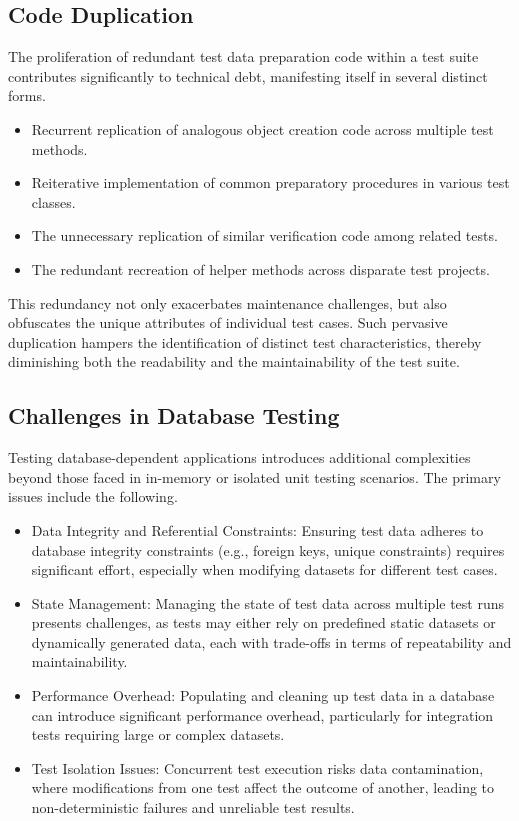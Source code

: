 \subsection{Code Duplication}
The proliferation of redundant test data preparation code within a test suite contributes significantly to technical debt, manifesting itself in several distinct forms.
	      \begin{itemize}
		      \item Recurrent replication of analogous object creation code across multiple test methods.
		      \item Reiterative implementation of common preparatory procedures in various test classes.
            \item The unnecessary replication of similar verification code among related tests.
            \item The redundant recreation of helper methods across disparate test projects.
	      \end{itemize}
This redundancy not only exacerbates maintenance challenges, but also obfuscates the unique attributes of individual test cases. Such pervasive duplication hampers the identification of distinct test characteristics, thereby diminishing both the readability and the maintainability of the test suite.

\subsection{Challenges in Database Testing}

Testing database-dependent applications introduces additional complexities beyond those faced in in-memory or isolated unit testing scenarios. The primary issues include the following.
 \begin{itemize}
  \item Data Integrity and Referential Constraints: Ensuring test data adheres to database integrity constraints (e.g., foreign keys, unique constraints) requires significant effort, especially when modifying datasets for different test cases.

   \item State Management: Managing the state of test data across multiple test runs presents challenges, as tests may either rely on predefined static datasets or dynamically generated data, each with trade-offs in terms of repeatability and maintainability.

 \item Performance Overhead: Populating and cleaning up test data in a database can introduce significant performance overhead, particularly for integration tests requiring large or complex datasets.

 \item Test Isolation Issues: Concurrent test execution risks data contamination, where modifications from one test affect the outcome of another, leading to non-deterministic failures and unreliable test results.
    \end{itemize}
